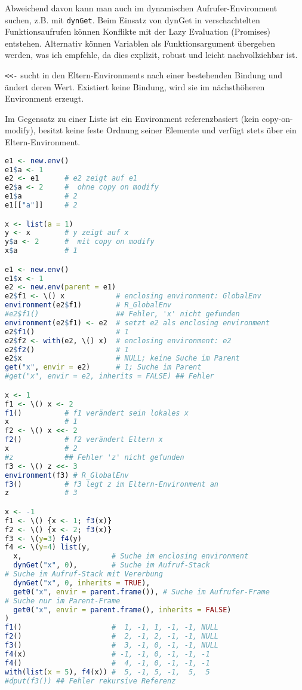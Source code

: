 \documentclass[10pt,twocolumn]{scrartcl}
\begin{document}
Abweichend davon kann man auch im dynamischen Aufrufer-Environment suchen, z.B. mit \lstinline|dynGet|. Beim Einsatz von dynGet in verschachtelten Funktionsaufrufen können Konflikte mit der Lazy Evaluation (Promises) entstehen. Alternativ können Variablen als Funktionsargument übergeben werden, was ich empfehle, da dies explizit, robust und leicht nachvollziehbar ist.

\lstinline|<<-| sucht in den Eltern-Environments nach einer bestehenden Bindung und ändert deren Wert. Existiert keine Bindung, wird sie im nächsthöheren Environment erzeugt.

Im Gegensatz zu einer Liste ist ein Environment referenzbasiert (kein copy-on-modify), 
besitzt keine feste Ordnung seiner Elemente und verfügt stets über ein Eltern-Environment.

\begin{lstlisting}[language=R]
e1 <- new.env()
e1$a <- 1
e2 <- e1      # e2 zeigt auf e1
e2$a <- 2     #  ohne copy on modify
e1$a          # 2
e1[["a"]]     # 2

x <- list(a = 1)
y <- x        # y zeigt auf x
y$a <- 2      #  mit copy on modify
x$a           # 1

e1 <- new.env()
e1$x <- 1
e2 <- new.env(parent = e1)
e2$f1 <- \() x            # enclosing environment: GlobalEnv
environment(e2$f1)        # R_GlobalEnv
#e2$f1()                  ## Fehler, 'x' nicht gefunden
environment(e2$f1) <- e2  # setzt e2 als enclosing environment
e2$f1()                   # 1
e2$f2 <- with(e2, \() x)  # enclosing environment: e2
e2$f2()                   # 1
e2$x                      # NULL; keine Suche im Parent
get("x", envir = e2)      # 1; Suche im Parent
#get("x", envir = e2, inherits = FALSE) ## Fehler

x <- 1
f1 <- \() x <- 2
f1()          # f1 verändert sein lokales x
x             # 1
f2 <- \() x <<- 2
f2()          # f2 verändert Eltern x
x             # 2
#z            ## Fehler 'z' nicht gefunden
f3 <- \() z <<- 3
environment(f3) # R_GlobalEnv
f3()          # f3 legt z im Eltern-Environment an
z             # 3

x <- -1
f1 <- \() {x <- 1; f3(x)}
f2 <- \() {x <- 2; f3(x)}
f3 <- \(y=3) f4(y)
f4 <- \(y=4) list(y,
  x,                     # Suche im enclosing environment
  dynGet("x", 0),        # Suche im Aufruf-Stack
# Suche im Aufruf-Stack mit Vererbung
  dynGet("x", 0, inherits = TRUE),
  get0("x", envir = parent.frame()), # Suche im Aufrufer-Frame
# Suche nur im Parent-Frame
  get0("x", envir = parent.frame(), inherits = FALSE)
)
f1()                     #  1, -1, 1, -1, -1, NULL
f2()                     #  2, -1, 2, -1, -1, NULL
f3()                     #  3, -1, 0, -1, -1, NULL
f4(x)                    # -1, -1, 0, -1, -1, -1
f4()                     #  4, -1, 0, -1, -1, -1
with(list(x = 5), f4(x)) #  5, -1, 5, -1,  5,  5
#dput(f3()) ## Fehler rekursive Referenz
\end{lstlisting}
\end{document}
